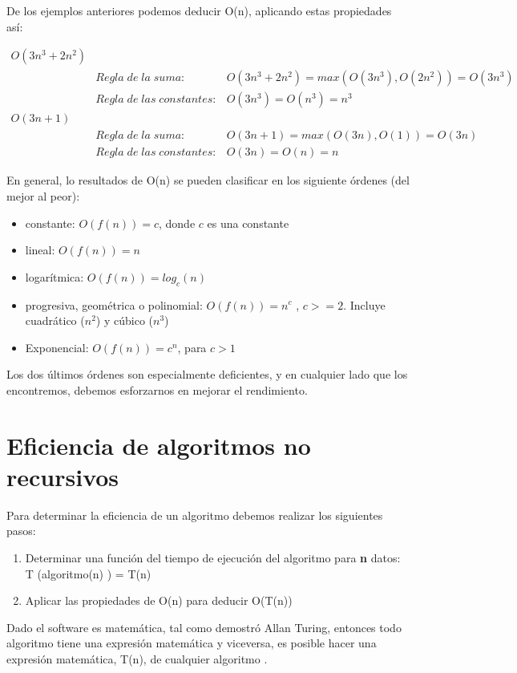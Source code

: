 De los ejemplos anteriores podemos deducir O(n), aplicando estas
propiedades así:

\[
\begin{array}{lll}
  O(3n^3 + 2n^2 )&&\\
  & Regla \;de\; la\; suma:& O(3n^3+2n^2)=max(O(3n^3),O(2n^2))=O(3n^3)\\
  &  Regla \;de\; las\; constantes:&O(3n^3)=O(n^3)=n^3\\
  O(3n+1)&&\\
  &Regla\; de\; la\; suma:&O(3n+1)=max(O(3n),O(1))= O(3n)\\
  &Regla\; de\; las\; constantes:&O(3n)=O(n)=n 
\end{array}
\]

En general, lo resultados de O(n) se pueden clasificar en los
siguiente órdenes (del mejor al peor):

\begin{itemize}
\item constante:   $O(f(n)) = c$, donde $c$ es una constante
\item lineal:          $O(f(n)) = n$
\item logarítmica: $O(f(n)) =  log_c(n)$
\item progresiva, geométrica o polinomial: $O(f(n))=n^c$ , $c>=2$.
  Incluye cuadrático ($n^2$) y cúbico ($n^3$)
\item Exponencial:  $O(f(n)) = c^n$, para $c > 1$
\end{itemize}

Los dos últimos órdenes son especialmente deficientes, y en cualquier
lado que los encontremos, debemos esforzarnos en mejorar el
rendimiento.

\section{Eficiencia de algoritmos no recursivos}
\label{sec:efic-de-algor-1}
Para determinar la eficiencia de un algoritmo debemos realizar los
siguientes pasos:

\begin{enumerate}
\item Determinar una función del tiempo de ejecución del algoritmo
  para \textbf{n} datos: T (algoritmo(n) ) = T(n)
\item Aplicar las propiedades de O(n) para deducir O(T(n))
\end{enumerate}

Dado el software es matemática, tal como demostró Allan Turing,
entonces todo algoritmo tiene una expresión matemática y viceversa, es
posible hacer una expresión matemática, T(n), de cualquier algoritmo .

